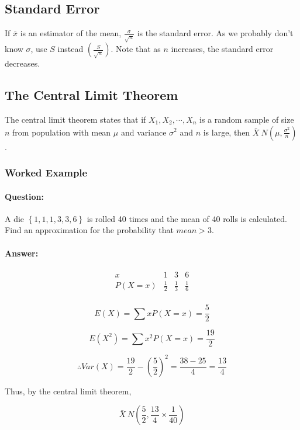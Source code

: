 \documentclass{article}
\begin{document}
\subsection{Standard Error}

If $\bar{x}$ is an estimator of the mean, $\frac{\sigma}{\sqrt n}$ is the
standard error. As we probably don't know $\sigma$, use $S$ instead
$\left(\frac{S}{\sqrt n}\right)$. Note that as $n$ increases, the standard error
decreases.

\subsection{The Central Limit Theorem}

The central limit theorem states that if $X_1,X_2,\cdots,X_n$ is a random sample
of size $n$ from population with mean $\mu$ and variance $\sigma^2$ and $n$ is
large, then $\bar{X} ~ N \left(\mu,\frac{\sigma^2}{n}\right)$.

\subsubsection{Worked Example}

\paragraph{Question:} A die $\left\{1, 1, 1, 3, 3, 6\right\}$ is rolled 40 times 
and the mean of 40 rolls is calculated. Find an approximation for the
probability that $\textit{mean}>3$.

\paragraph{Answer:}
\[\begin{array}{cccc}
    x      & 1           & 3           & 6 \\
    P(X=x) & \frac{1}{2} & \frac{1}{3} & \frac{1}{6} \\
\end{array}\]

\[E(X)=\sum x P(X=x) = \frac{5}{2}\]

\[E(X^2)=\sum x^2 P(X=x) = \frac{19}{2}\]

\[\therefore Var(X) = \frac{19}{2} - \left(\frac{5}{2}\right)^2 = \frac{38 -
25}{4} = \frac{13}{4}\]

\noindent Thus, by the central limit theorem,

\[\bar{X} ~ N\left(\frac{5}{2}, \frac{13}{4} \times \frac{1}{40}\right)\]
    
\end{document}
